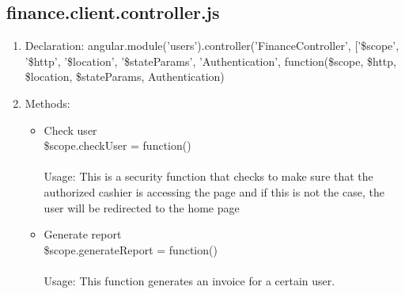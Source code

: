 \documentclass[a4paper,12pt]{report}
\begin{document}
\subsection{finance.client.controller.js}
\begin{enumerate}
\item Declaration: angular.module('users').controller('FinanceController', ['\$scope', '\$http', '\$location', '\$stateParams', 'Authentication',
    function(\$scope, \$http, \$location, \$stateParams, Authentication)  
\item Methods:
	\begin{itemize}
		\item Check user \\ \$scope.checkUser = function() 
	\\ \\ Usage: This is a security function that checks to make sure that the authorized cashier is accessing the page and if this is not the case, the user will be redirected to the home page
	\item Generate report\\
	\$scope.generateReport = function()
	\\ \\Usage: This function generates an invoice for a certain user.
	\end{itemize}	
\end{enumerate}
\end{document}

